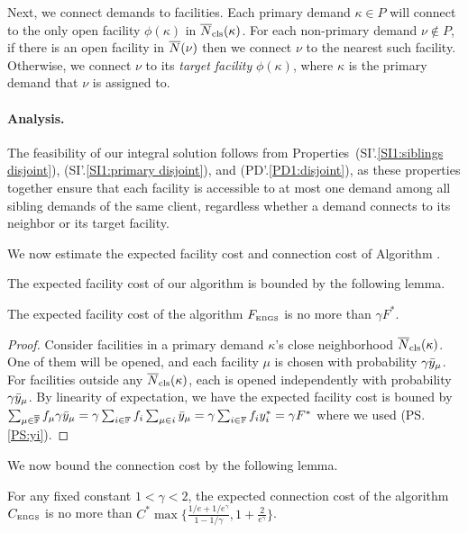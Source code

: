 Next, we connect demands to facilities.
Each primary demand $\kappa\in P$ will connect
to the only open facility $\phi(\kappa)$ in ${\overline{N}}_{\text{cls}}(\kappa)$.  
For each non-primary demand $\nu\notin P$, if
there is an open facility in ${\overline{N}}(\nu)$ then we connect
$\nu$ to the nearest such facility. Otherwise, we connect
$\nu$ to its \emph{target facility} $\phi(\kappa)$, where $\kappa$ is the primary
demand that $\nu$ is assigned to. 


\paragraph{Analysis.}
The feasibility of our integral solution follows from
Properties~(SI'.\ref{SI1:siblings disjoint}), (SI'.\ref{SI1:primary
  disjoint}), and (PD'.\ref{PD1:disjoint}), as these properties together
ensure that each facility is accessible to at most one demand among
all sibling demands of the same client, regardless whether a demand
connects to its neighbor or its target facility.

We now estimate the expected facility cost and connection cost of
Algorithm {\EBGS}.

The expected facility cost of our algorithm is bounded by the
following lemma.

\begin{lemma} \label{lem: EBGS facility cost}
  The expected facility cost of the algorithm $F_{\mbox{\tiny\rm EBGS}}$ is no more
  than $\gamma F^\ast$.
\end{lemma}
\begin{proof}
  Consider facilities in a primary demand $\kappa$'s close
  neighborhood ${\overline{N}}_{\text{cls}}(\kappa)$. One of them will be opened, and
  each facility $\mu$ is chosen with probability $\gamma
  {\bar y}_{\mu}$. For facilities outside any ${\overline{N}}_{\text{cls}}(\kappa)$, each
  is opened independently with probability $\gamma {\bar y}_{\mu}$. By
  linearity of expectation, we have the expected facility cost is
  bouned by $\sum_{\mu \in \overline{\mathbb{F}}} f_\mu \gamma {\bar y}_{\mu} =
  \gamma \sum_{i\in \mathbb{F}} f_i \sum_{\mu\in i} {\bar y}_{\mu} =
  \gamma \sum_{i \in \mathbb{F}} f_i y_i^\ast = \gamma F^\ast$ where we
  used (PS.\ref{PS:yi}).

\end{proof}

We now bound the connection cost by the following lemma.
\begin{lemma}\label{lem: EBGS connection cost}
  For any fixed constant $1 < \gamma < 2$, the expected connection
  cost of the algorithm $C_{\mbox{\tiny\rm EBGS}}$ is no more than
  $C^\ast\max\{\frac{1/e+1/e^\gamma}{1-1/\gamma},
  1+\frac{2}{e^\gamma}\}$.
\end{lemma}

